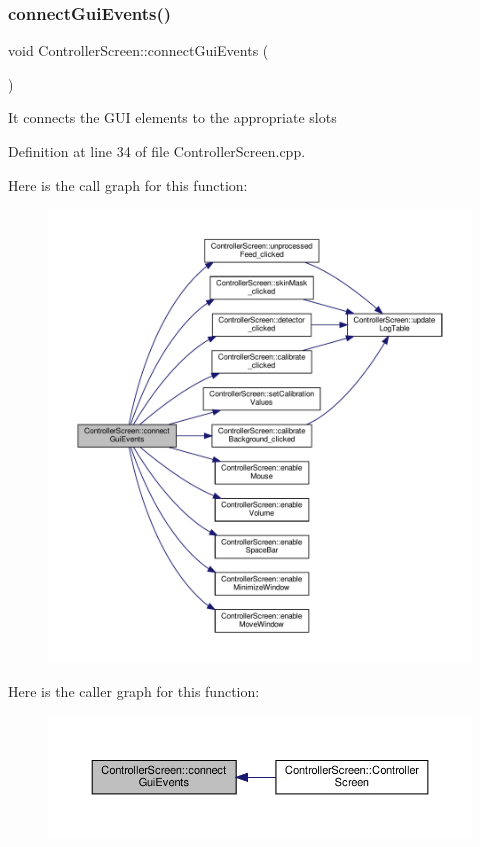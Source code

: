 \subsubsection{\texorpdfstring{connect\+Gui\+Events()}{connectGuiEvents()}}
{\footnotesize\ttfamily void Controller\+Screen\+::connect\+Gui\+Events (\begin{DoxyParamCaption}{ }\end{DoxyParamCaption})\hspace{0.3cm}{\ttfamily [private]}}

It connects the G\+UI elements to the appropriate slots 

Definition at line 34 of file Controller\+Screen.\+cpp.

Here is the call graph for this function\+:
\nopagebreak
\begin{figure}[H]
\begin{center}
\leavevmode
\includegraphics[width=350pt]{class_controller_screen_acf89cc74ff8383884d11a067b3243d4a_cgraph}
\end{center}
\end{figure}
Here is the caller graph for this function\+:
\nopagebreak
\begin{figure}[H]
\begin{center}
\leavevmode
\includegraphics[width=350pt]{class_controller_screen_acf89cc74ff8383884d11a067b3243d4a_icgraph}
\end{center}
\end{figure}
